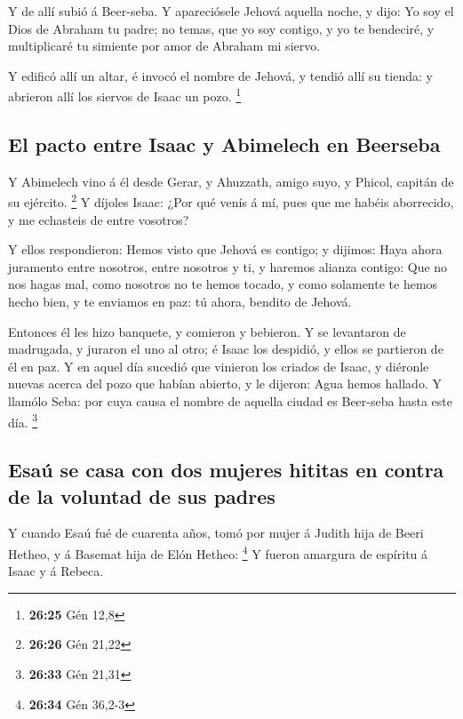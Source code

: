  Y de allí subió á Beer-seba.  Y apareciósele
Jehová aquella noche, y dijo: Yo soy el Dios de Abraham tu padre; no
temas, que yo soy contigo, y yo te bendeciré, y multiplicaré tu simiente
por amor de Abraham mi siervo.

 Y edificó allí un altar, é invocó el nombre de Jehová, y
tendió allí su tienda: y abrieron allí los siervos de Isaac un pozo.
\footnote{\textbf{26:25} Gén 12,8}

\hypertarget{el-pacto-entre-isaac-y-abimelech-en-beerseba}{%
\subsection{El pacto entre Isaac y Abimelech en
Beerseba}\label{el-pacto-entre-isaac-y-abimelech-en-beerseba}}

 Y Abimelech vino á él desde Gerar, y Ahuzzath, amigo suyo,
y Phicol, capitán de su ejército. \footnote{\textbf{26:26} Gén 21,22}
 Y díjoles Isaac: ¿Por qué venís á mí, pues que me habéis
aborrecido, y me echasteis de entre vosotros?

 Y ellos respondieron: Hemos visto que Jehová es contigo; y
dijimos: Haya ahora juramento entre nosotros, entre nosotros y ti, y
haremos alianza contigo:  Que no nos hagas mal, como
nosotros no te hemos tocado, y como solamente te hemos hecho bien, y te
enviamos en paz: tú ahora, bendito de Jehová.

 Entonces él les hizo banquete, y comieron y bebieron.
 Y se levantaron de madrugada, y juraron el uno al otro; é
Isaac los despidió, y ellos se partieron de él en paz.  Y
en aquel día sucedió que vinieron los criados de Isaac, y diéronle
nuevas acerca del pozo que habían abierto, y le dijeron: Agua hemos
hallado.  Y llamólo Seba: por cuya causa el nombre de
aquella ciudad es Beer-seba hasta este día. \footnote{\textbf{26:33} Gén
  21,31}

\hypertarget{esauxfa-se-casa-con-dos-mujeres-hititas-en-contra-de-la-voluntad-de-sus-padres}{%
\subsection{Esaú se casa con dos mujeres hititas en contra de la
voluntad de sus
padres}\label{esauxfa-se-casa-con-dos-mujeres-hititas-en-contra-de-la-voluntad-de-sus-padres}}

 Y cuando Esaú fué de cuarenta años, tomó por mujer á
Judith hija de Beeri Hetheo, y á Basemat hija de Elón Hetheo:
\footnote{\textbf{26:34} Gén 36,2-3}  Y fueron amargura de
espíritu á Isaac y á Rebeca.

